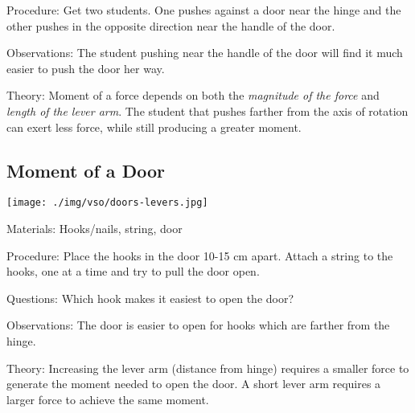 \begin{multicols}{2}
\begin{description*}
\item[Procedure:]{Get two students. One pushes against a door near the hinge and the other pushes in the opposite direction near the handle of the door.}
\item[Observations:]{The student pushing near the handle of the door will find it much easier to push the door her way.}
\item[Theory:]{Moment of a force depends on both the \emph{magnitude of the force} and \emph{length of the lever arm}. The student that pushes farther from the axis of rotation can exert less force, while still producing a greater moment.}
\end{description*}

\columnbreak

\subsection{Moment of a Door}

\begin{center}
\texttt{[image: ./img/vso/doors-levers.jpg]}
\end{center}

\begin{description*}
\item[Materials:]{Hooks/nails, string, door}
\item[Procedure:]{Place the hooks in the door 10-15 cm apart. Attach a string to the hooks, one at a time and try to pull the door open.}
\item[Questions:]{Which hook makes it easiest to open the door?}
\item[Observations:]{The door is easier to open for hooks which are farther from the hinge.}
\item[Theory:]{Increasing the lever arm (distance from hinge) requires a smaller force to generate the moment needed to open the door. A short lever arm requires a larger force to achieve the same moment.}
\end{description*}


\end{multicols}

